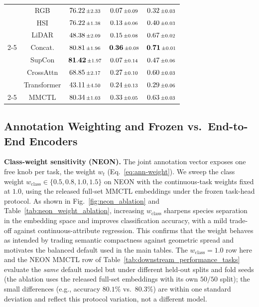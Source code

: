 \documentclass[10pt,twocolumn,letterpaper]{article}
\newcommand{\new}[1]{#1}
\begin{document}
\begin{table}[t]
{{\begin{tabular}{l c c c c}
& RGB        
& $76.22\,\scriptstyle\pm\,\!2.33$ 
& $0.07 \,\scriptstyle\pm\,\!0.09$ 
& $0.32 \,\scriptstyle\pm\,\!0.03$ \\
& HSI        
& $76.22 \,\scriptstyle\pm\,\!1.38$ 
& $0.13 \,\scriptstyle\pm\,\!0.06$ 
& $0.40\,\scriptstyle\pm\,\!0.03$ \\
& LiDAR      
& $48.38 \,\scriptstyle\pm\,\!2.09$ 
& $0.15 \,\scriptstyle\pm\,\!0.08$ 
& $0.67 \,\scriptstyle\pm\,\!0.02$ \\
\cmidrule(lr){2-5}
& Concat.    
& $80.81 \,\scriptstyle\pm\,\!1.96$ 
& $\mathbf{0.36} \,\scriptstyle\pm\,\!0.08$ 
& $\mathbf{0.71} \,\scriptstyle\pm\,\!0.01$ \\
& SupCon  
& $\mathbf{81.42} \,\scriptstyle\pm\,\!1.97$ 
& $0.07 \,\scriptstyle\pm\,\!0.14$ 
& $0.47 \,\scriptstyle\pm\,\!0.06$ \\
& CrossAttn    
& $68.85 \,\scriptstyle\pm\,\!2.17$ 
& $0.27\,\scriptstyle\pm\,\!0.10$ 
& $0.60 \,\scriptstyle\pm\,\!0.03$ \\
& Transformer    
& $43.11 \,\scriptstyle\pm\,\!4.50$ 
& $0.24\,\scriptstyle\pm\,\!0.13$ 
& $0.29 \,\scriptstyle\pm\,\!0.06$ \\
\cmidrule(lr){2-5}  
& MMCTL      
& $80.34 \,\scriptstyle\pm\,\!1.03$ 
& $0.33 \,\scriptstyle\pm\,\!0.05$ 
& $0.63 \,\scriptstyle\pm\,\!0.03$ \\
\bottomrule
\end{tabular}}
}
\end{table}


\subsection{\new{Annotation Weighting and Frozen vs.\ End-to-End Encoders}}
\label{subsec:weight-e2e}

\new{\noindent\textbf{Class-weight sensitivity (NEON).}
The joint annotation vector exposes one free knob per task, the weight $w_t$ (Eq.~\eqref{eq:ann-weight}). We sweep the class weight $w_{\text{class}}\in\{0.5,0.8,1.0,1.5\}$ on NEON with the continuous-task weights fixed at $1.0$, using the released full-set MMCTL embeddings under the frozen task-head protocol. As shown in Fig.~\ref{fig:neon_ablation} and Table~\ref{tab:neon_weight_ablation}, increasing $w_{\text{class}}$ sharpens species separation in the embedding space and improves classification accuracy, with a mild trade-off against continuous-attribute regression. This confirms that the weight behaves as intended by trading semantic compactness against geometric spread and motivates the balanced default used in the main tables. The $w_{\text{class}}{=}1.0$ row here and the NEON MMCTL row of Table~\ref{tab:downstream_performance_tasks} evaluate the \emph{same} default model but under different held-out splits and fold seeds (the ablation uses the released full-set embeddings with its own $50/50$ split); the small differences (e.g., accuracy $80.1\%$ vs.\ $80.3\%$) are within one standard deviation and reflect this protocol variation, not a different model.}
\end{document}
